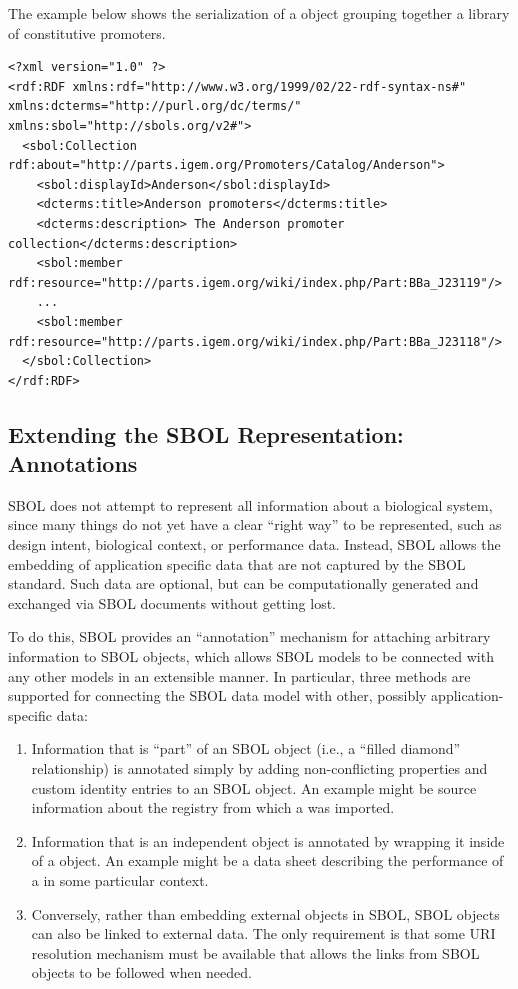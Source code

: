 The example below shows the serialization of a  object grouping together a library of constitutive promoters.
\begin{lstlisting}
<?xml version="1.0" ?>
<rdf:RDF xmlns:rdf="http://www.w3.org/1999/02/22-rdf-syntax-ns#" xmlns:dcterms="http://purl.org/dc/terms/" xmlns:sbol="http://sbols.org/v2#">
  <sbol:Collection rdf:about="http://parts.igem.org/Promoters/Catalog/Anderson">
    <sbol:displayId>Anderson</sbol:displayId>
    <dcterms:title>Anderson promoters</dcterms:title>
    <dcterms:description> The Anderson promoter collection</dcterms:description>
    <sbol:member rdf:resource="http://parts.igem.org/wiki/index.php/Part:BBa_J23119"/>
    ...
    <sbol:member rdf:resource="http://parts.igem.org/wiki/index.php/Part:BBa_J23118"/>
  </sbol:Collection>
</rdf:RDF>

\end{lstlisting}
\label{ser:Collection}

\subsection{Extending the SBOL Representation:  Annotations}
\label{sec:Annotations}


SBOL does not attempt to represent all information about a biological system, since many things do not yet have a clear ``right way'' to be represented, such as design intent, biological context, or performance data.  Instead, SBOL allows the embedding of application specific data that are not captured by the SBOL standard.  Such data are optional, but can be computationally generated and exchanged via SBOL documents without getting lost. 

To do this, SBOL provides an ``annotation'' mechanism for attaching arbitrary information to SBOL objects, which allows SBOL models to be connected with any other models in an extensible manner.
In particular, three methods are supported for connecting the SBOL data model with other, possibly application-specific data:
\begin{enumerate}
\item Information that is ``part'' of an SBOL object (i.e., a ``filled diamond'' relationship) is annotated simply by adding non-conflicting properties and custom identity entries to an SBOL object.  An example might be source information about the registry from which a  was imported.
\item Information that is an independent object is annotated by wrapping it inside of a  object.  An example might be a data sheet describing the performance of a  in some particular context.
\item Conversely, rather than embedding external objects in SBOL, SBOL objects can also be linked to external data.  The only requirement is that some URI resolution mechanism must be available that allows the links from SBOL objects to be followed when needed.
\end{enumerate}

